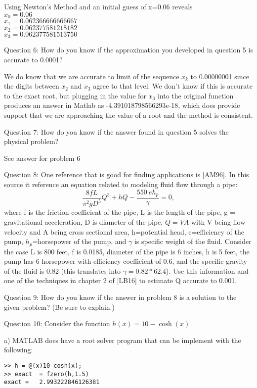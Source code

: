 \documentclass{article}
\renewcommand{\cite}[1]{[#1]}
\def\ds{\displaystyle}
\begin{document}
{\color{teal} Using Newton's Method and an initial guess of x=0.06 reveals\\
$\ds x_0= 0.06 $\\
$\ds x_1= 0.062366666666667$\\
$\ds x_2= 0.062377581218182$\\
$\ds x_3= 0.062377581513750$\\
}
\medskip \par \noindent
Question 6: How do you know if the approximation you developed in question 5 is accurate to 0.0001?   

{\color{teal}We do know that we are accurate to limit of the sequence $x_k$ to 0.00000001 since the digits between $x_2$ and $x_3$ agree to that level. We don't know if this is accurate to the exact root, but plugging in the value for $x_3$ into the original function produces an answer in Matlab as  -4.391018798566293e-18, which does provide support that we are approaching the value of a root and the method is consistent. }
\medskip \par \noindent
Question 7: How do you know if the answer found in question 5 solves the physical problem?

{\color{teal}See answer for problem 6}
\medskip \par \noindent
Question 8: One reference that is good for finding applications is \cite{AM96}. In this source it reference an equation related to modeling fluid flow through a pipe:
$$\frac {8fL}{\pi^2 g D^5}Q^3 + hQ - \frac {550 \ eh_p}{\gamma} =0,$$
where f is the friction coefficient of the pipe, L is the length of the pipe, g = gravitational acceleration, D is diameter of the pipe, $Q=VA$ with V being flow velocity and A being cross sectional area, h=potential head, e=efficiency of the pump, $h_p$=horsepower of the pump, and $\gamma$ is specific weight of the fluid. Consider the case L is 800 feet, f is 0.0185, diameter of the pipe is 6 inches, h is 5 feet, the pump has 6 horsepower with efficiency coefficient of 0.6, and the specific gravity of the fluid is 0.82 (this translates into $\gamma = 0.82*62.4$). Use this information and one of the techniques in chapter 2 of \cite{LB16} to estimate Q accurate to 0.001. 
\medskip \par \noindent
Question 9: How do you know if the answer in problem 8 is a solution to the given problem? (Be sure to explain.)
\medskip \par \noindent
Question 10: Consider the function $\ds h(x)=10-\cosh(x)$

a) MATLAB does have a root solver program that can be implement with the following:
\begin{verbatim}
>> h = @(x)10-cosh(x);
>> exact  = fzero(h,1.5)
exact =   2.993222846126381
   \end{verbatim}
\end{document}
